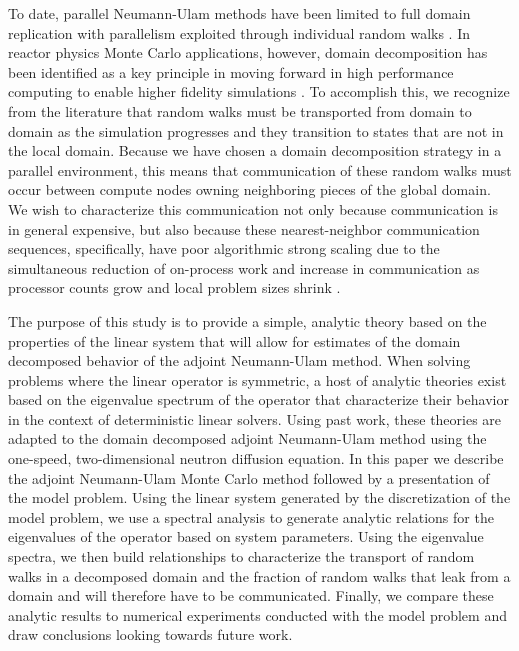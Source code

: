 \documentclass[preprint,11pt]{elsarticle}
\begin{document}
To date, parallel Neumann-Ulam methods have been limited to full domain
replication with parallelism exploited through individual random walks
\cite{alexandrov_efficient_1998}. In reactor physics Monte Carlo applications,
however, domain decomposition has been identified as a key principle in moving
forward in high performance computing to enable higher fidelity simulations
\cite{brunner_comparison_2006,brunner_efficient_2009,siegel_analysis_2012}. To
accomplish this, we recognize from the literature that random walks must be
transported from domain to domain as the simulation progresses and they
transition to states that are not in the local domain. Because we have chosen
a domain decomposition strategy in a parallel environment, this means that
communication of these random walks must occur between compute nodes owning
neighboring pieces of the global domain. We wish to characterize this
communication not only because communication is in general expensive, but also
because these nearest-neighbor communication sequences, specifically, have
poor algorithmic strong scaling due to the simultaneous reduction of
on-process work and increase in communication as processor counts grow and
local problem sizes shrink \cite{gropp_high-performance_2001}.

The purpose of this study is to provide a simple, analytic theory based on the
properties of the linear system that will allow for estimates of the domain
decomposed behavior of the adjoint Neumann-Ulam method. When solving problems
where the linear operator is symmetric, a host of analytic theories exist
based on the eigenvalue spectrum of the operator that characterize their
behavior in the context of deterministic linear solvers. Using past work,
these theories are adapted to the domain decomposed adjoint Neumann-Ulam
method using the one-speed, two-dimensional neutron diffusion equation. In
this paper we describe the adjoint Neumann-Ulam Monte Carlo method followed by
a presentation of the model problem. Using the linear system generated by the
discretization of the model problem, we use a spectral analysis to generate
analytic relations for the eigenvalues of the operator based on system
parameters. Using the eigenvalue spectra, we then build relationships to
characterize the transport of random walks in a decomposed domain and
the fraction of random walks that leak from a domain and will therefore have to
be communicated. Finally, we compare these analytic results to numerical
experiments conducted with the model problem and draw conclusions looking
towards future work.
\end{document}
